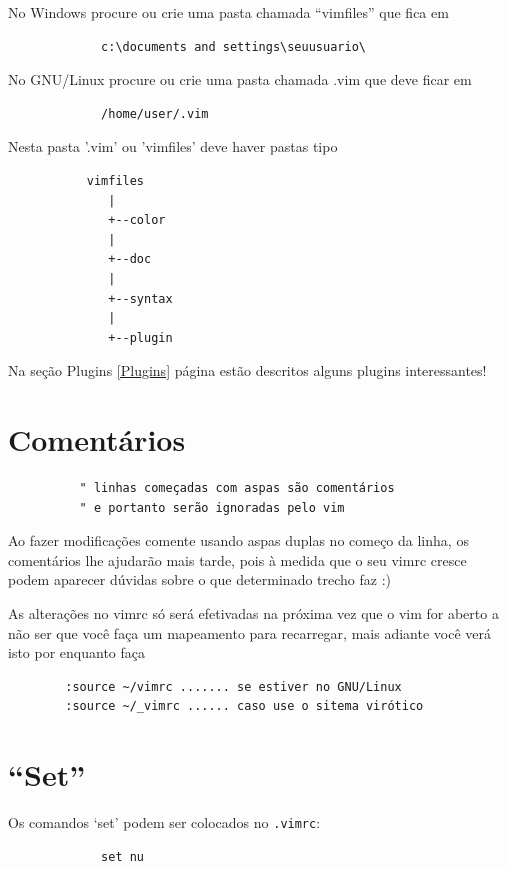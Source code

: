\documentclass[10pt,a4paper,openany]{book}
\begin{document}
No Windows procure ou crie uma pasta chamada ``vimfiles'' que fica em

\begin{verbatim}
			 c:\documents and settings\seuusuario\
\end{verbatim}

No GNU/Linux procure ou crie uma pasta chamada .vim que deve ficar em

\begin{verbatim}
			 /home/user/.vim
\end{verbatim}

Nesta pasta '.vim' ou 'vimfiles' deve haver pastas tipo

\begin{verbatim}
		   vimfiles
			  |
			  +--color
			  |
			  +--doc
			  |
			  +--syntax
			  |
			  +--plugin
\end{verbatim}

Na seção Plugins \ref{Plugins} página \pageref{Plugins}
estão descritos alguns plugins interessantes!

\section{Comentários }
\label{Comentários }

\begin{verbatim}
		  " linhas começadas com aspas são comentários
		  " e portanto serão ignoradas pelo vim
\end{verbatim}

Ao fazer modificações comente usando aspas duplas no começo da linha,
os comentários lhe ajudarão mais tarde, pois à medida que o seu vimrc
cresce podem aparecer dúvidas sobre o que determinado trecho faz :)


As alterações no vimrc só será efetivadas na próxima vez que o vim for aberto
a não ser que você faça um mapeamento para recarregar, mais adiante você verá isto
por enquanto faça

\begin{verbatim}
		:source ~/vimrc ....... se estiver no GNU/Linux
		:source ~/_vimrc ...... caso use o sitema virótico
\end{verbatim}

\section{``Set''}
\label{``Set''}
Os comandos `set' podem ser colocados no \verb|.vimrc|:

\begin{verbatim}
			 set nu
\end{verbatim}
\end{document}
